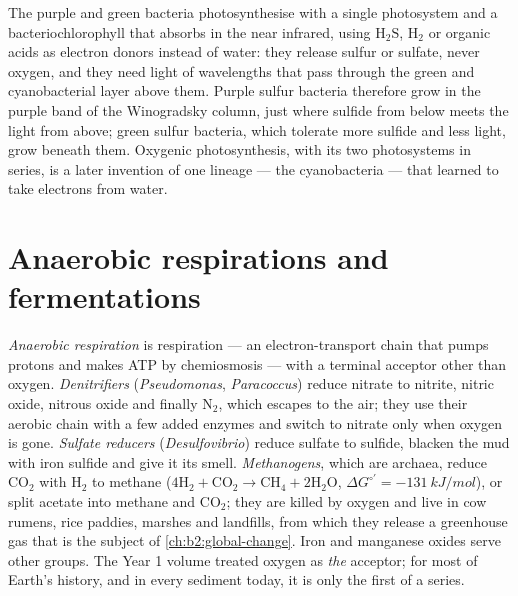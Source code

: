 \begin{definition}\label{def:b2:microbial-metabolism:anoxygenic}
The purple and green bacteria photosynthesise with a single
photosystem and a bacteriochlorophyll that absorbs in the near
infrared, using $\mathrm{H_2S}$, $\mathrm{H_2}$ or organic acids as
electron donors instead of water: they release sulfur or sulfate,
never oxygen, and they need light of wavelengths that pass through
the green and cyanobacterial layer above them. Purple sulfur
bacteria therefore grow in the purple band of the Winogradsky
column, just where sulfide from below meets the light from above;
green sulfur bacteria, which tolerate more sulfide and less light,
grow beneath them. Oxygenic photosynthesis, with its two photosystems
in series, is a later invention of one lineage --- the cyanobacteria
--- that learned to take electrons from water.
\end{definition}

\section{Anaerobic respirations and fermentations}

\begin{definition}\label{def:b2:microbial-metabolism:anaerobic}
\emph{Anaerobic respiration} is respiration --- an electron-transport
chain that pumps protons and makes ATP by chemiosmosis --- with a
terminal acceptor other than oxygen. \emph{Denitrifiers}
(\emph{Pseudomonas}, \emph{Paracoccus}) reduce nitrate to nitrite,
nitric oxide, nitrous oxide and finally $\mathrm{N_2}$, which escapes
to the air; they use their aerobic chain with a few added enzymes
and switch to nitrate only when oxygen is gone. \emph{Sulfate
reducers} (\emph{Desulfovibrio}) reduce sulfate to sulfide, blacken
the mud with iron sulfide and give it its smell. \emph{Methanogens},
which are archaea, reduce $\mathrm{CO_2}$ with $\mathrm{H_2}$ to
methane ($4\mathrm{H_2} + \mathrm{CO_2} \to \mathrm{CH_4} +
2\mathrm{H_2O}$, $\Delta G^{\circ\prime} = \qty{-131}{kJ/mol}$), or
split acetate into methane and $\mathrm{CO_2}$; they are killed by
oxygen and live in cow rumens, rice paddies, marshes and landfills,
from which they release a greenhouse gas that is the subject of
\cref{ch:b2:global-change}. Iron and manganese oxides serve other
groups. The Year 1 volume treated oxygen as \emph{the} acceptor; for
most of Earth's history, and in every sediment today, it is only the
first of a series.
\end{definition}

